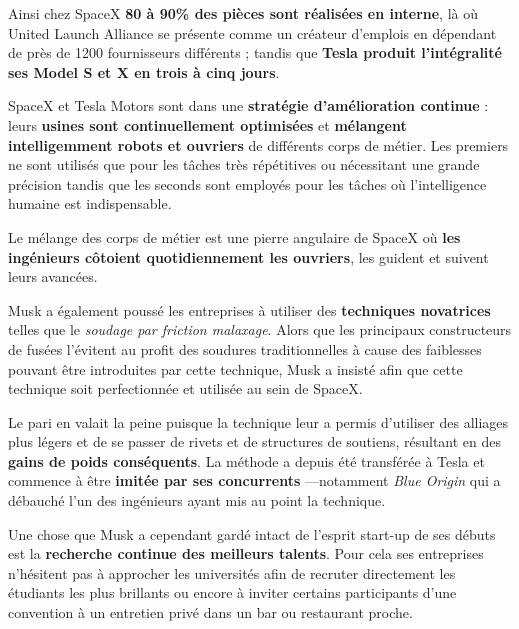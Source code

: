 Ainsi chez SpaceX \textbf{80 à 90\% des pièces sont réalisées en interne}, là où United Launch Alliance se présente comme un créateur d’emplois en dépendant de près de 1200 fournisseurs différents ; tandis que \textbf{Tesla produit l'intégralité ses Model S et X en trois à cinq jours}.

\vspace{5mm}

SpaceX et Tesla Motors sont dans une \textbf{stratégie d'amélioration continue} : leurs \textbf{usines sont continuellement optimisées} et \textbf{mélangent intelligemment robots et ouvriers} de différents corps de métier. Les premiers ne sont utilisés que pour les tâches très répétitives ou nécessitant une grande précision tandis que les seconds sont employés pour les tâches où l'intelligence humaine est indispensable\supercite{TeslaFactoryPart2}.

Le mélange des corps de métier est une pierre angulaire de SpaceX où \textbf{les ingénieurs côtoient quotidiennement les ouvriers}, les guident et suivent leurs avancées.

\vspace{5mm}

Musk a également poussé les entreprises à utiliser des \textbf{techniques novatrices} telles que le \textit{soudage par friction malaxage}. Alors que les principaux constructeurs de fusées l'évitent au profit des soudures traditionnelles à cause des faiblesses pouvant être introduites par cette technique, Musk a insisté afin que cette technique soit perfectionnée et utilisée au sein de SpaceX. 

Le pari en valait la peine puisque la technique leur a permis d'utiliser des alliages plus légers et de se passer de rivets et de structures de soutiens, résultant en des \textbf{gains de poids conséquents}. La méthode a depuis été transférée à Tesla et commence à être \textbf{imitée par ses concurrents} ---notamment \textit{Blue Origin} qui a débauché l'un des ingénieurs ayant mis au point la technique.

\vspace{5mm}

Une chose que Musk a cependant gardé intact de l'esprit start-up de ses débuts est la \textbf{recherche continue des meilleurs talents}. Pour cela ses entreprises n'hésitent pas à approcher les universités afin de recruter directement les étudiants les plus brillants ou encore à inviter certains participants d'une convention à un entretien privé dans un bar ou restaurant proche.

